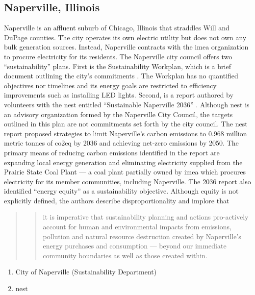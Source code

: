 \subsection{Naperville, Illinois}
Naperville is an affluent suburb of Chicago, Illinois that straddles Will and
DuPage counties. The city operates its own electric utility but does not own any
bulk generation sources. Instead, Naperville contracts with the \ac{imea}
organization to procure electricity for its residents. The Naperville city
council offers two ``sustainability'' plans. First is the Sustainability
Workplan, which is a brief document outlining the city's commitments
\cite{mjolness_city_2025}. The Workplan has no quantified objectives nor
timelines and its energy goals are restricted to efficiency improvements such as
installing LED lights. Second, is a report authored by volunteers with the
\acl{nest} entitled ``Sustainable Naperville 2036''
\cite{trendler_sustainable_2021}. Although \ac{nest} is an advisory organization
formed by the Naperville City Council, the targets outlined in this plan are not
commitments set forth by the city council. The \ac{nest} report proposed
strategies to limit Naperville's carbon emissions to 0.968 million metric tonnes
of \ac{co2eq} by 2036 and achieving net-zero emissions by 2050. The primary
means of reducing carbon emissions identified in the report are expanding local
energy generation and eliminating electricity supplied from the Prairie State
Coal Plant --- a coal plant partially owned by \ac{imea} which procures
electricity for its member communities, including Naperville. The 2036 report
also identified ``energy equity'' as a sustainability objective. Although equity
is not explicitly defined, the authors describe disproportionality and implore
that
\begin{quote}
    \blockcquote[11]{trendler_sustainable_2021}{it is imperative that
    sustainability planning and actions pro-actively account for human and
    environmental  
    impacts from emissions, pollution and natural resource destruction created
    by Naperville's energy purchases and  consumption --- beyond our immediate
    community boundaries as well as those created within.}
\end{quote}
\begin{enumerate}
    \item City of Naperville (Sustainability Department)
    \item \ac{nest}
\end{enumerate}



